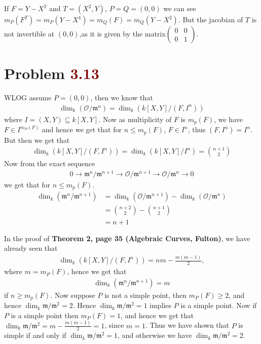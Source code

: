 \documentclass[12pt]{article}
\begin{document}
\vspace*{0.2cm}

\noindent {} If $F= Y-X^2$ and $T =(X^2,Y)$, $P=Q =(0,0)$ we can see $m_P(F^T)=m_P(Y-X^4)=m_Q(F)=m_Q(Y-X^2)$. But the jacobian of $T$ is not invertible at $(0,0)$,as it is given by the matrix$\begin{pmatrix}
    0 & 0\\
    0 & 1
\end{pmatrix}$.\Qed

\section{Problem \textcolor{maroon}{3.13}} 

WLOG assume $P = (0,0)$, then we know that 
\begin{align*}
    \dim_k \left( \mathscr{O}/\mathfrak{m}^n \right) = \dim_k \left( k[X,Y]/(F,I^n)\right)
\end{align*}
where $I = (X,Y) \subseteq k[X,Y]$. Now as multiplicity of $F$ is $m_p(F)$, we have $F \in I^{m_P(F)}$ and hence we get that for $n \leq m_p(F)$, $F \in I^n$, thus $(F,I^n) = I^n$. But then we get that 
\begin{align*}
    \dim_k \left( k[X,Y]/(F,I^n)\right) = \dim_k\left(k[X,Y]/I^n\right) = \binom{n+1}{2} 
\end{align*}
Now from the exact sequence 
\begin{align*}
    0 \to \mathfrak{m}^n/\mathfrak{m}^{n+1} \to \mathscr{O}/\mathfrak{m}^{n+1} \to \mathscr{O}/\mathfrak{m}^n \to 0
\end{align*}
we get that for $n \leq m_p(F)$.
\begin{align*}
    \dim_k \left( \mathfrak{m}^n/\mathfrak{m}^{n+1} \right) &= \dim_k \left( \mathscr{O}/\mathfrak{m}^{n+1}\right) - \dim_k(\mathscr{O}/\mathfrak{m}^n) \\ &= \binom{n+2}{2} - \binom{n+1}{2} \\ &= n+1
\end{align*}

In the proof of \textbf{Theorem 2, page 35 (Algebraic Curves, Fulton)}, we have already seen that 
\begin{align*}
    \dim_k \left(k[X,Y]/(F,I^n)\right) = n m - \frac{m(m-1)}{2},
\end{align*} 
where $m = m_P(F)$, hence we get that 
\begin{align*}
    \dim_k \left( \mathfrak{m}^n/\mathfrak{m}^{n+1} \right) = m
\end{align*}
if $n \geq m_p(F)$. Now suppose $P$ is not a simple point, then $m_P(F) \geq 2$, and hence $\dim_k \mathfrak{m}/\mathfrak{m}^2 = 2$. Hence $\dim_k \mathfrak{m}/\mathfrak{m}^2 = 1$ implies $P$ is a simple point. Now if $P$ is a simple point then $m_P(F) = 1$, and hence we get that $\dim_k \mathfrak{m}/\mathfrak{m}^2 = m - \frac{m(m-1)}{2} = 1$, since $m=1$. Thus we have shown that $P$ is simple if and only if $\dim_k \mathfrak{m}/\mathfrak{m}^2 = 1$, and otherwise we have $\dim_k \mathfrak{m}/\mathfrak{m}^2 = 2$.
\end{document}
